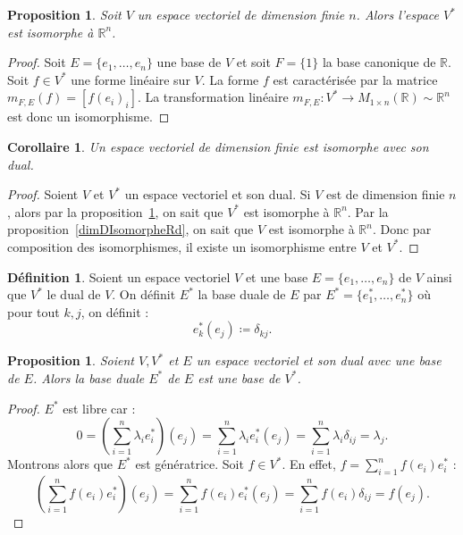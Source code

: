 \documentclass{article}
\newcommand{\R}{\mathbb R}
\newcommand{\M}[3]{M_{#1 \times #2}(#3)}
\newtheorem{prp}[thm]{Proposition}
\newtheorem{cor}[thm]{Corollaire}
\theoremstyle{definition}
\newtheorem{déf}[thm]{Définition}
\theoremstyle{remark}
\begin{document}
		\begin{prp}\label{dualIsoMRn} Soit $V$ un espace vectoriel de dimension finie $n$. Alors l'espace $V^*$ est isomorphe à $\R^n$. \end{prp}

		\begin{proof} Soit $E = \{e_1, \ldots, e_n\}$ une base de $V$ et soit $F = \{1\}$ la base canonique de $\R$. Soit $f \in V^*$ une forme linéaire sur $V$. La forme $f$
		est caractérisée par la matrice $m_{F, E}(f) = [f(e_i)_i]$. La transformation linéaire $m_{F, E} : V^* \to \M 1n\R \sim \R^n$ est donc un isomorphisme. \end{proof}

		\begin{cor}\label{VisoMV*} Un espace vectoriel de dimension finie est isomorphe avec son dual. \end{cor}

		\begin{proof} Soient $V$ et $V^*$ un espace vectoriel et son dual. Si $V$ est de dimension finie $n$, alors par la proposition~\ref{dualIsoMRn}, on sait que $V^*$ est
		isomorphe à $\R^n$. Par la proposition~\ref{dimDIsomorpheRd}, on sait que $V$ est isomorphe à $\R^n$. Donc par composition des isomorphismes, il existe un isomorphisme
		entre $V$ et $V^*$. \end{proof}

		\begin{déf} Soient un espace vectoriel $V$ et une base $E = \{e_1, \ldots, e_n\}$ de $V$ ainsi que $V^*$ le dual de $V$. On définit $E^*$ la base duale de $E$ par
		$E^* = \{e_1^*, \ldots, e_n^*\}$ où pour tout $k, j$, on définit : \[e_k^*(e_j) \coloneqq \delta_{kj}.\] \end{déf}

		\begin{prp} Soient $V, V^*$ et $E$ un espace vectoriel et son dual avec une base de $E$. Alors la base duale $E^*$ de $E$ est une base de $V^*$. \end{prp}

		\begin{proof} $E^*$ est libre car : \[0 = \left(\sum_{i=1}^n\lambda_ie_i^*\right)(e_j) = \sum_{i=1}^n\lambda_ie_i^*(e_j) = \sum_{i=1}^n\lambda_i\delta_{ij}
		= \lambda_j.\] Montrons alors que $E^*$ est génératrice. Soit $f \in V^*$. En effet, $f = \sum_{i=1}^nf(e_i)e_i^*$ :
		\[\left(\sum_{i=1}^nf(e_i)e_i^*\right)(e_j) = \sum_{i=1}^nf(e_i)e_i^*(e_j) = \sum_{i=1}^nf(e_i)\delta_{ij} = f(e_j).\] \end{proof}
\end{document}
